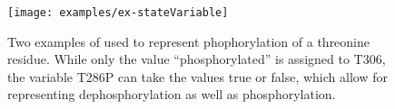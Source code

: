\begin{figure}[H]
  \centering
  \texttt{[image: examples/ex-stateVariable]}
  \caption{Two examples of  used to represent phophorylation of a threonine residue. While only the value ``phosphorylated'' is assigned to T306, the variable T286P can take the values true or false, which allow for representing dephosphorylation as well as phosphorylation.}
  \label{fig:ex-state-Variable}
\end{figure}

% 
% 
% 
% 



